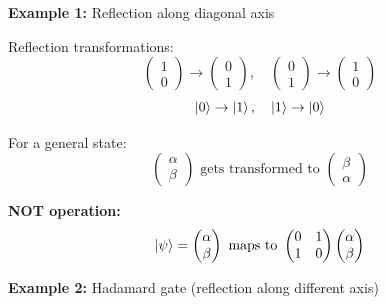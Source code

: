 \textbf{Example 1:} Reflection along diagonal axis

\begin{center}
\end{center}

Reflection transformations:
$$\begin{pmatrix} 1 \\ 0 \end{pmatrix} \to \begin{pmatrix} 0 \\ 1 \end{pmatrix}, \quad \begin{pmatrix} 0 \\ 1 \end{pmatrix} \to \begin{pmatrix} 1 \\ 0 \end{pmatrix}$$
$$\ket{0} \to \ket{1}, \quad \ket{1} \to \ket{0}$$

For a general state:
$$\begin{pmatrix} \alpha \\ \beta \end{pmatrix} \text{ gets transformed to } \begin{pmatrix} \beta \\ \alpha \end{pmatrix}$$

\textbf{NOT operation:} 
$$\ket{\psi} = \begin{pmatrix} \alpha \\ \beta \end{pmatrix} \text{ maps to } \begin{pmatrix} 0 & 1 \\ 1 & 0 \end{pmatrix}\begin{pmatrix} \alpha \\ \beta \end{pmatrix}$$

\textbf{Example 2:} Hadamard gate (reflection along different axis)


